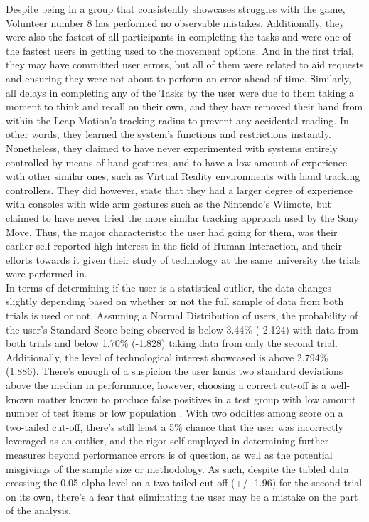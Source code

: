     Despite being in a group that consistently showcases struggles with the game, Volunteer number 8 has performed no observable mistakes. Additionally, they were also the fastest of all participants in completing the tasks and were one of the fastest users in getting used to the movement options. And in the first trial, they may have committed user errors, but all of them were related to aid requests and ensuring they were not about to perform an error ahead of time. Similarly, all delays in completing any of the Tasks by the user were due to them taking a moment to think and recall on their own, and they have removed their hand from within the Leap Motion’s tracking radius to prevent any accidental reading. In other words, they learned the system’s functions and restrictions instantly.\\ 
    Nonetheless, they claimed to have never experimented with systems entirely controlled by means of hand gestures, and to have a low amount of experience with other similar ones, such as Virtual Reality environments with hand tracking controllers. They did however, state that they had a larger degree of experience with consoles with wide arm gestures such as the Nintendo’s Wiimote, but claimed to have never tried the more similar tracking approach used by the Sony Move. Thus, the major characteristic the user had going for them, was their earlier self-reported high interest in the field of Human Interaction, and their efforts towards it given their study of technology at the same university the trials were performed in.\\
    In terms of determining if the user is a statistical outlier, the data changes slightly depending based on whether or not the full sample of data from both trials is used or not. Assuming a Normal Distribution of users, the probability of the user’s Standard Score being observed is below 3.44\% (-2.124) with data from both trials and below 1.70\% (-1.828) taking data from only the second trial. Additionally, the level of technological interest showcased is above 2,794\% (1.886). There’s enough of a suspicion the user lands two standard deviations above the median in performance, however, choosing a correct cut-off is a well-known matter known to produce false positives in a test group with low amount number of test items or low population \cite{hambleton1978use} \cite{ingraham1996empirical}. With two oddities among score on a two-tailed cut-off, there’s still least a 5\% chance that the user was incorrectly leveraged as an outlier, and the rigor self-employed in determining further measures beyond performance errors is of question, as well as the potential misgivings of the sample size or methodology. As such, despite the tabled data crossing the 0.05 alpha level on a two tailed cut-off (+/- 1.96) for the second trial on its own, there’s a fear that eliminating the user may be a mistake on the part of the analysis.\\

